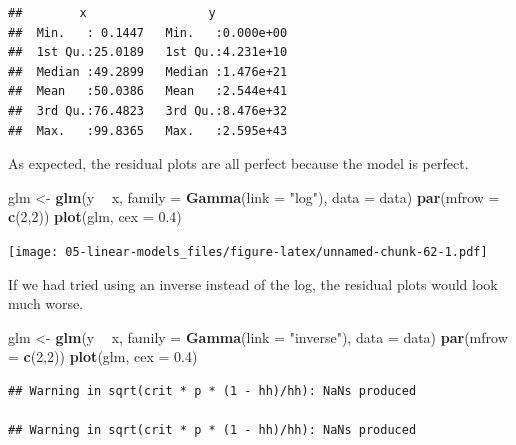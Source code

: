 \documentclass[
  openany]{book}
\newenvironment{Shaded}{\begin{snugshade}}{\end{snugshade}}
\newcommand{\DataTypeTok}[1]{\textcolor[rgb]{0.13,0.29,0.53}{#1}}
\newcommand{\DecValTok}[1]{\textcolor[rgb]{0.00,0.00,0.81}{#1}}
\newcommand{\FloatTok}[1]{\textcolor[rgb]{0.00,0.00,0.81}{#1}}
\newcommand{\KeywordTok}[1]{\textcolor[rgb]{0.13,0.29,0.53}{\textbf{#1}}}
\newcommand{\NormalTok}[1]{#1}
\newcommand{\OperatorTok}[1]{\textcolor[rgb]{0.81,0.36,0.00}{\textbf{#1}}}
\newcommand{\StringTok}[1]{\textcolor[rgb]{0.31,0.60,0.02}{#1}}
\begin{document}
\begin{verbatim}
##        x                 y            
##  Min.   : 0.1447   Min.   :0.000e+00  
##  1st Qu.:25.0189   1st Qu.:4.231e+10  
##  Median :49.2899   Median :1.476e+21  
##  Mean   :50.0386   Mean   :2.544e+41  
##  3rd Qu.:76.4823   3rd Qu.:8.476e+32  
##  Max.   :99.8365   Max.   :2.595e+43
\end{verbatim}

As expected, the residual plots are all perfect because the model is perfect.

\begin{Shaded}
\begin{Highlighting}[]
\NormalTok{glm <-}\StringTok{ }\KeywordTok{glm}\NormalTok{(y }\OperatorTok{~}\StringTok{ }\NormalTok{x, }\DataTypeTok{family =} \KeywordTok{Gamma}\NormalTok{(}\DataTypeTok{link =} \StringTok{"log"}\NormalTok{), }\DataTypeTok{data =}\NormalTok{ data)}
\KeywordTok{par}\NormalTok{(}\DataTypeTok{mfrow =} \KeywordTok{c}\NormalTok{(}\DecValTok{2}\NormalTok{,}\DecValTok{2}\NormalTok{))}
\KeywordTok{plot}\NormalTok{(glm, }\DataTypeTok{cex =} \FloatTok{0.4}\NormalTok{)}
\end{Highlighting}
\end{Shaded}

\texttt{[image: 05-linear-models\_files/figure-latex/unnamed-chunk-62-1.pdf]}

If we had tried using an inverse instead of the log, the residual plots would look much worse.

\begin{Shaded}
\begin{Highlighting}[]
\NormalTok{glm <-}\StringTok{ }\KeywordTok{glm}\NormalTok{(y }\OperatorTok{~}\StringTok{ }\NormalTok{x, }\DataTypeTok{family =} \KeywordTok{Gamma}\NormalTok{(}\DataTypeTok{link =} \StringTok{"inverse"}\NormalTok{), }\DataTypeTok{data =}\NormalTok{ data)}
\KeywordTok{par}\NormalTok{(}\DataTypeTok{mfrow =} \KeywordTok{c}\NormalTok{(}\DecValTok{2}\NormalTok{,}\DecValTok{2}\NormalTok{))}
\KeywordTok{plot}\NormalTok{(glm, }\DataTypeTok{cex =} \FloatTok{0.4}\NormalTok{)}
\end{Highlighting}
\end{Shaded}

\begin{verbatim}
## Warning in sqrt(crit * p * (1 - hh)/hh): NaNs produced

## Warning in sqrt(crit * p * (1 - hh)/hh): NaNs produced
\end{verbatim}
\end{document}
